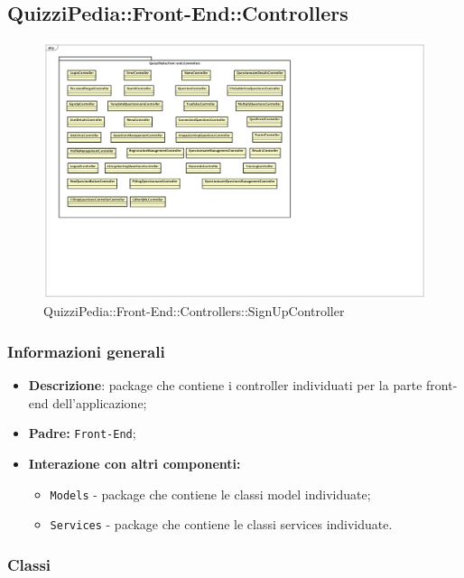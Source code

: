 \newpage
\subsection{QuizziPedia::Front-End::Controllers}


\begin{figure}
	\centering
	\includegraphics[scale=0.45]{UML/Package/QuizziPedia_Front-End_Controllers.png}
	\caption{QuizziPedia::Front-End::Controllers::SignUpController}
\end{figure}

\subsubsection{Informazioni generali}
\begin{itemize}
	\item \textbf{Descrizione}: package che contiene i controller individuati per la parte front-end dell'applicazione;
	\item \textbf{Padre:} \texttt{Front-End};
	\item \textbf{Interazione con altri componenti:}
	\begin{itemize}
		\item \texttt{Models} - package che contiene le classi model individuate;
		\item \texttt{Services} - package che contiene le classi services individuate.
	\end{itemize} 
\end{itemize}
\subsubsection{Classi}

